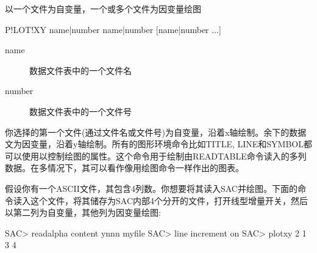 \label{cmd:plotxy}

以一个文件为自变量，一个或多个文件为因变量绘图

\begin{SACSTX}
P!LOT!XY name|number name|number [name|number ...]
\end{SACSTX}

\begin{description}
\item [name] 数据文件表中的一个文件名 
\item [number] 数据文件表中的一个文件号 
\end{description}

你选择的第一个文件(通过文件名或文件号)为自变量，沿着x轴绘制。余下的数据文为因变量，沿着y轴绘制。所有的图形环境命令比如TITLE, LINE和SYMBOL都可以使用以控制绘图的属性。这个命令用于绘制由READTABLE命令读入的多列数据。在多情况下，其可以看作像用绘图命令一样作出的图表。

假设你有一个ASCII文件，其包含4列数。你想要将其读入SAC并绘图。下面的命令读入这个文件，将其储存为SAC内部4个分开的文件，打开线型增量开关，然后以第二列为自变量，其他列为因变量绘图:
\begin{SACCode}
SAC> readalpha content ynnn myfile
SAC> line increment on
SAC> plotxy 2 1 3 4
\end{SACCode}
